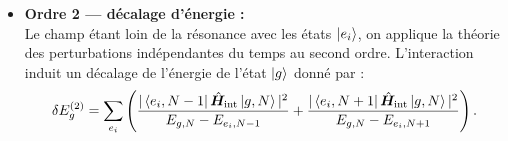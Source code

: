\begin{itemize}[label = $\bullet$]
	\item \textbf{Ordre 2 — décalage d’énergie :}\\	
	Le champ étant loin de la résonance avec les états \( \ket{e_i} \), 
	on applique la théorie des perturbations indépendantes du temps au second ordre. 
	L’interaction induit un décalage de l’énergie de l’état \( \ket{g} \) donné par :
	\begin{eqnarray}\label{eq.7.34}
		\delta E_g^{(2)} 
		= \sum_{e_i} \left (  
		\frac{|\bra{e_i, N-1} \hat{\bm{H}}_{\mathrm{int}} \ket{g, N}|^2}{E_{g,N} - E_{e_i, N-1}} 
		+ \frac{|\bra{e_i, N+1} \hat{\bm{H}}_{\mathrm{int}} \ket{g, N}|^2}{E_{g,N} - E_{e_i, N+1}}
		\right).
	\end{eqnarray}

\end{itemize}

\medskip


%
%
%



